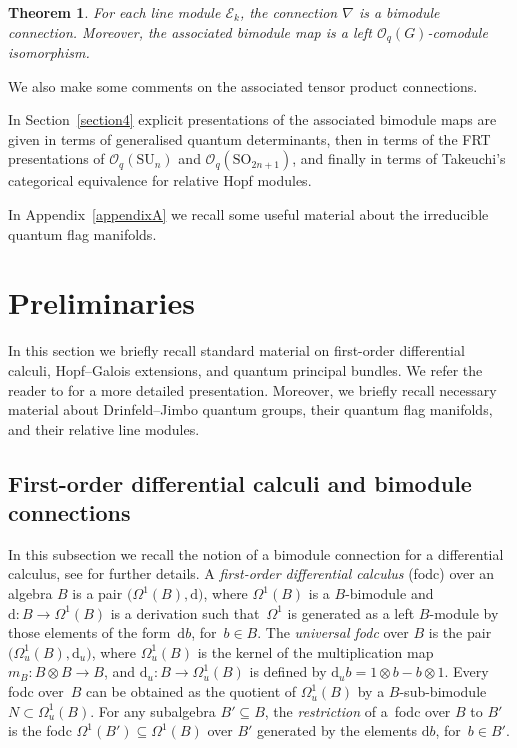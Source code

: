 \documentclass[pdftex]{sigma}
\numberwithin{equation}{section}
\newtheorem{Theorem}{Theorem}[section]
\begin{document}
\begin{Theorem}
For each line module $\mathcal{E}_k$, the connection $\nabla$ is a bimodule connection. Moreover, the associated bimodule map is a left $\mathcal{O}_q(G)$-comodule isomorphism.
\end{Theorem}

We also make some comments on the associated tensor product connections.

In Section~\ref{section4} explicit presentations of the associated bimodule maps are given in terms of generalised quantum determinants, then in terms of the FRT presentations of $\mathcal{O}_q(\mathrm{SU}_n)$ and $\mathcal{O}_q(\mathrm{SO}_{2n+1})$, and finally in terms of Takeuchi's categorical equivalence for relative Hopf modules.

In Appendix~\ref{appendixA} we recall some useful material about the irreducible quantum flag manifolds.


\section{Preliminaries}\label{section2}

In this section we briefly recall standard material on first-order differential calculi, Hopf--Galois extensions, and quantum principal bundles. We refer the reader to \cite{BeggsMajid:Leabh} for a more detailed presentation. Moreover, we briefly recall necessary material about Drinfeld--Jimbo quantum groups, their quantum flag manifolds, and their relative line modules.


\subsection{First-order differential calculi and bimodule connections}\label{section2.1}

In this subsection we recall the notion of a bimodule connection for a differential calculus, see \cite[Section~3.4]{BeggsMajid:Leabh} for further details. A {\em first-order differential calculus} (fodc) over an algebra $B$ is a pair $\big(\Omega^1(B),\mathrm{d}\big)$, where $\Omega^1(B)$ is a $B$-bimodule and $\mathrm{d}\colon B \to \Omega^1(B)$ is a derivation such that~$\Omega^1$ is generated as a left $B$-module by those elements of the form~$\mathrm{d} b$, for~$b \in B$.
The {\em universal fodc} over $B$ is the pair $\big(\Omega^1_u(B), \mathrm{d}_u\big)$, where $\Omega^1_u(B)$ is the kernel of the multiplication map $m_B\colon B \otimes B \to B$, and $\mathrm{d}_u\colon B \to \Omega^1_u(B)$ is defined by $\mathrm{d}_u b = 1 \otimes b - b \otimes 1$. Every fodc over~$B$ can be obtained as the quotient of $\Omega^1_u(B)$ by a $B$-sub-bimodule $N\subset \Omega^1_u(B)$. For any subalgebra $B' \subseteq B$, the \emph{restriction} of a~fodc over $B$ to $B'$ is the fodc $\Omega^1(B') \subseteq \Omega^1(B)$ over $B'$ generated by the elements $\mathrm{d}b$, for~$b \in B'$.
\end{document}
